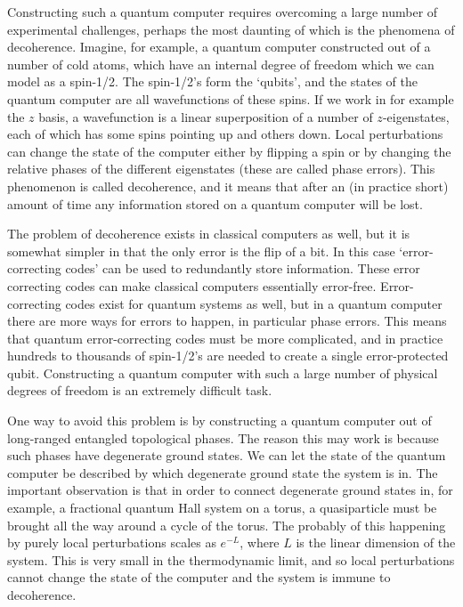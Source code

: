 Constructing such a quantum computer requires overcoming a large number of experimental challenges, perhaps the most daunting of which is the phenomena of decoherence. Imagine, for example, a quantum computer constructed out of a number of cold atoms, which have an internal degree of freedom which we can model as a spin-1/2. The spin-1/2's form the `qubits', and the states of the quantum computer are all wavefunctions of these spins. If we work in for example the $z$ basis, a wavefunction is a linear superposition of a number of $z$-eigenstates, each of which has some spins pointing up and others down. Local perturbations can change the state of the computer either by flipping a spin or by changing the relative phases of the different eigenstates (these are called phase errors). This phenomenon is called decoherence, and it means that after an (in practice short) amount of time any information stored on a quantum computer will be lost.

The problem of decoherence exists in classical computers as well, but it is somewhat simpler in that the only error is the flip of a bit. In this case `error-correcting codes' can be used to redundantly store information. These error correcting codes can make classical computers essentially error-free. Error-correcting codes exist for quantum systems as well, but in a quantum computer there are more ways for errors to happen, in particular phase errors. This means that quantum error-correcting codes must be more complicated, and in practice hundreds to thousands of spin-1/2's are needed to create a single error-protected qubit. Constructing a quantum computer with such a large number of physical degrees of freedom is an extremely difficult task.

One way to avoid this problem is by constructing a quantum computer out of long-ranged entangled topological phases. The reason this may work is because such phases have degenerate ground states. We can let the state of the quantum computer be described by which degenerate ground state the system is in. The important observation is that in order to connect degenerate ground states in, for example, a fractional quantum Hall system on a torus, a quasiparticle must be brought all the way around a cycle of the torus. The probably of this happening by purely local perturbations scales as $e^{-L}$, where $L$ is the linear dimension of the system. This is very small in the thermodynamic limit, and so local perturbations cannot change the state of the computer and the system is immune to decoherence.

